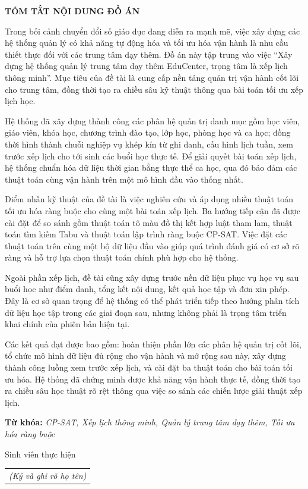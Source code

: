 \documentclass[../DoAn.tex]{subfiles}
\begin{document}
\begin{center}
    \Large{\textbf{TÓM TẮT NỘI DUNG ĐỒ ÁN}}\\
\end{center}
\vspace{1cm}
Trong bối cảnh chuyển đổi số giáo dục đang diễn ra mạnh mẽ, việc xây dựng các hệ thống quản lý có khả năng tự động hóa và tối ưu hóa vận hành là nhu cầu thiết thực đối với các trung tâm dạy thêm. Đồ án này tập trung vào việc ``Xây dựng hệ thống quản lý trung tâm dạy thêm EduCenter, trọng tâm là xếp lịch thông minh''. Mục tiêu của đề tài là cung cấp nền tảng quản trị vận hành cốt lõi cho trung tâm, đồng thời tạo ra chiều sâu kỹ thuật thông qua bài toán tối ưu xếp lịch học.

Hệ thống đã xây dựng thành công các phân hệ quản trị danh mục gồm học viên, giáo viên, khóa học, chương trình đào tạo, lớp học, phòng học và ca học; đồng thời hình thành chuỗi nghiệp vụ khép kín từ ghi danh, cấu hình lịch tuần, xem trước xếp lịch cho tới sinh các buổi học thực tế. Để giải quyết bài toán xếp lịch, hệ thống chuẩn hóa dữ liệu thời gian bằng thực thể ca học, qua đó bảo đảm các thuật toán cùng vận hành trên một mô hình đầu vào thống nhất.

Điểm nhấn kỹ thuật của đề tài là việc nghiên cứu và áp dụng nhiều thuật toán tối ưu hóa ràng buộc cho cùng một bài toán xếp lịch. Ba hướng tiếp cận đã được cài đặt để so sánh gồm thuật toán tô màu đồ thị kết hợp luật tham lam, thuật toán tìm kiếm Tabu và thuật toán lập trình ràng buộc CP-SAT. Việc đặt các thuật toán trên cùng một bộ dữ liệu đầu vào giúp quá trình đánh giá có cơ sở rõ ràng và hỗ trợ lựa chọn thuật toán chính phù hợp cho hệ thống.

Ngoài phần xếp lịch, đề tài cũng xây dựng trước nền dữ liệu phục vụ học vụ sau buổi học như điểm danh, tổng kết nội dung, kết quả học tập và đơn xin phép. Đây là cơ sở quan trọng để hệ thống có thể phát triển tiếp theo hướng phân tích dữ liệu học tập trong các giai đoạn sau, nhưng không phải là trọng tâm triển khai chính của phiên bản hiện tại.

Các kết quả đạt được bao gồm: hoàn thiện phần lớn các phân hệ quản trị cốt lõi, tổ chức mô hình dữ liệu đủ rộng cho vận hành và mở rộng sau này, xây dựng thành công luồng xem trước xếp lịch, và cài đặt ba thuật toán cho bài toán tối ưu hóa. Hệ thống đã chứng minh được khả năng vận hành thực tế, đồng thời tạo ra chiều sâu học thuật rõ rệt thông qua việc so sánh các chiến lược giải thuật xếp lịch.

\textbf{Từ khóa:} \textit{CP-SAT, Xếp lịch thông minh, Quản lý trung tâm dạy thêm, Tối ưu hóa ràng buộc}

\begin{flushright}
Sinh viên thực hiện\\
\begin{tabular}{@{}c@{}}
\textit{(Ký và ghi rõ họ tên)}
\end{tabular}
\end{flushright}
\end{document}
